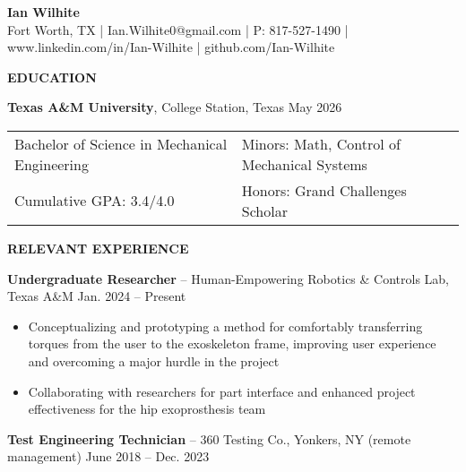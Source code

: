 \documentclass[18pt]{article}
\begin{document}

\begin{center}
    \vspace{-\baselineskip}
    \LARGE \textbf{Ian Wilhite}\\ 
    \small Fort Worth, TX | Ian.Wilhite0@gmail.com | P: 817-527-1490 | www.linkedin.com/in/Ian-Wilhite | github.com/Ian-Wilhite
\end{center}

\vspace{-0.5\baselineskip}
\begin{center}
    \textbf{EDUCATION}
    \hrulefill
\end{center}
\vspace{-0.5\baselineskip}

\textbf{Texas A\&M University}, College Station, Texas \hfill May 2026

\begin{tabular}{l|l} %
    Bachelor of Science in Mechanical Engineering \hspace*{0.25in} & Minors: Math, Control of Mechanical Systems \\ 
    Cumulative GPA: 3.4/4.0 & Honors: Grand Challenges Scholar\\
\end{tabular}

\begin{center}
    \textbf{RELEVANT EXPERIENCE}
    \hrulefill
\end{center}
\vspace{-0.5\baselineskip}

\textbf{Undergraduate Researcher} – Human-Empowering Robotics \& Controls Lab, Texas A\&M \hfill Jan. 2024 – Present

\begin{itemize}[noitemsep]
    \vspace{-0.5\baselineskip}
    \item Conceptualizing and prototyping a method for comfortably transferring torques from the user to the exoskeleton frame, improving user experience and overcoming a major hurdle in the project
    \item Collaborating with researchers for part interface and enhanced project effectiveness for the hip exoprosthesis team
\end{itemize}

\vspace{-0.5\baselineskip}
\textbf{Test Engineering Technician} – 360 Testing Co., Yonkers, NY (remote management) \hfill June 2018 – Dec. 2023
\end{document}
